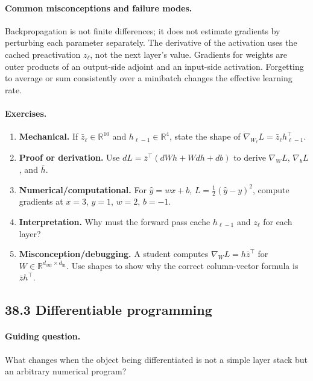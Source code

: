 \paragraph{Common misconceptions and failure modes.}
Backpropagation is not finite differences; it does not estimate gradients by perturbing each parameter separately. The derivative of the activation uses the cached preactivation \(z_\ell\), not the next layer's value. Gradients for weights are outer products of an output-side adjoint and an input-side activation. Forgetting to average or sum consistently over a minibatch changes the effective learning rate.

\paragraph{Exercises.}
\begin{enumerate}[label=\textbf{38.2.\arabic*.}, leftmargin=*]
\item \textbf{Mechanical.} If \(\bar z_\ell\in\mathbb R^{10}\) and \(h_{\ell-1}\in\mathbb R^{4}\), state the shape of \(\nabla_{W_\ell}L=\bar z_\ell h_{\ell-1}^\top\).
\item \textbf{Proof or derivation.} Use \(dL=\bar z^\top(dW h+Wdh+db)\) to derive \(\nabla_WL\), \(\nabla_bL\), and \(\bar h\).
\item \textbf{Numerical/computational.} For \(\widehat y=wx+b\), \(L=\frac12(\widehat y-y)^2\), compute gradients at \(x=3\), \(y=1\), \(w=2\), \(b=-1\).
\item \textbf{Interpretation.} Why must the forward pass cache \(h_{\ell-1}\) and \(z_\ell\) for each layer?
\item \textbf{Misconception/debugging.} A student computes \(\nabla_WL=h\bar z^\top\) for \(W\in\mathbb R^{d_{\mathrm{out}}\times d_{\mathrm{in}}}\). Use shapes to show why the correct column-vector formula is \(\bar z h^\top\).
\end{enumerate}

\subsection{38.3 Differentiable programming}

\paragraph{Guiding question.}
What changes when the object being differentiated is not a simple layer stack but an arbitrary numerical program?

